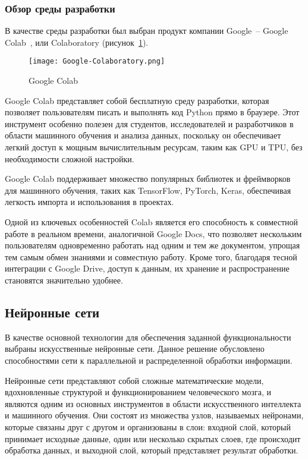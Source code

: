 \subsubsection{Обзор среды разработки}

В качестве среды разработки был выбран продукт компании Google~-- Google Colab~\cite{colab}, или Colaboratory (рисунок~\ref{domain::colab}). 

\begin{figure}[ht]
    \centering
    \texttt{[image: Google-Colaboratory.png]}
    \caption{Google Colab}
    \label{domain::colab}
\end{figure}

Google Colab представляет собой бесплатную среду разработки, которая позволяет пользователям писать и выполнять код Python прямо в браузере. Этот инструмент особенно полезен для студентов, исследователей и разработчиков в области машинного обучения и анализа данных, поскольку он обеспечивает легкий доступ к мощным вычислительным ресурсам, таким как GPU и TPU, без необходимости сложной настройки.

Google Colab поддерживает множество популярных библиотек и фреймворков для машинного обучения, таких как TensorFlow, PyTorch, Keras, обеспечивая легкость импорта и использования в проектах. 

Одной из ключевых особенностей Colab является его способность к совместной работе в реальном времени, аналогичной Google Docs, что позволяет нескольким пользователям одновременно работать над одним и тем же документом, упрощая тем самым обмен знаниями и совместную работу. Кроме того, благодаря тесной интеграции с Google Drive, доступ к данным, их хранение и распространение становятся значительно удобнее.

\subsection{Нейронные сети}

В качестве основной технологии для обеспечения заданной функциональности выбраны искусственные нейронные сети. Данное решение обусловлено способностями сети к параллельной и распределенной обработки информации.

Нейронные сети представляют собой сложные математические модели, вдохновленные структурой и функционированием человеческого мозга, и являются одним из основных инструментов в области искусственного интеллекта и машинного обучения. Они состоят из множества узлов, называемых нейронами, которые связаны друг с другом и организованы в слои: входной слой, который принимает исходные данные, один или несколько скрытых слоев, где происходит обработка данных, и выходной слой, который представляет результат обработки.

